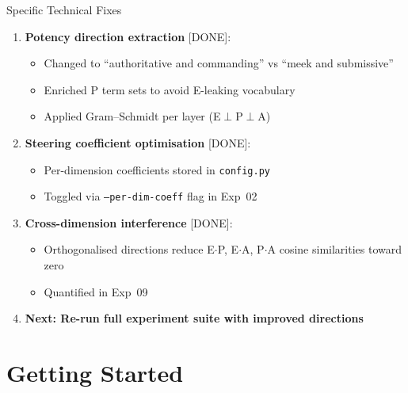 \documentclass[aspectratio=169,11pt]{beamer}
\begin{document}
\begin{frame}{Specific Technical Fixes}

\begin{enumerate}
    \item \textbf{Potency direction extraction}
    \textcolor{AccentGreen}{[DONE]}:
    \begin{itemize}
        \item Changed to ``authoritative and commanding'' vs ``meek and submissive''
        \item Enriched P term sets to avoid E-leaking vocabulary
        \item Applied Gram--Schmidt per layer (E$\perp$P$\perp$A)
    \end{itemize}

    \item \textbf{Steering coefficient optimisation}
    \textcolor{AccentGreen}{[DONE]}:
    \begin{itemize}
        \item Per-dimension coefficients stored in \texttt{config.py}
        \item Toggled via \texttt{--per-dim-coeff} flag in Exp~02
    \end{itemize}

    \item \textbf{Cross-dimension interference}
    \textcolor{AccentGreen}{[DONE]}:
    \begin{itemize}
        \item Orthogonalised directions reduce E$\cdot$P, E$\cdot$A, P$\cdot$A
              cosine similarities toward zero
        \item Quantified in Exp~09
    \end{itemize}

    \item \textbf{Next: Re-run full experiment suite with improved directions}
\end{enumerate}
\end{frame}

\section{Getting Started}
\end{document}
